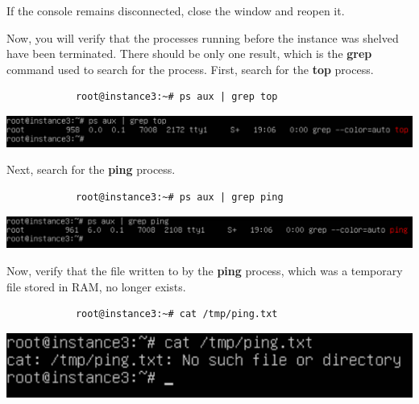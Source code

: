 \documentclass[letterpaper, 12pt]{article}
\begin{document}
\begin{enumerate}
    \begin{tipbox}
        If the console remains disconnected, close the window and reopen it.
    \end{tipbox}

    \begin{labstep}
        Now, you will verify that the processes running before the instance was shelved have been terminated.
        There should be only one result, which is the \textbf{grep} command used to search for the process.
        First, search for the \textbf{top} process.
        \begin{lstlisting}
            root@instance3:~# ps aux | grep top
        \end{lstlisting}

        \begin{center}
            \includegraphics[width=\linewidth]{images/part6/step14.png}
        \end{center}
    \end{labstep}

    \begin{labstep}
        Next, search for the \textbf{ping} process.
        \begin{lstlisting}
            root@instance3:~# ps aux | grep ping
        \end{lstlisting}

        \begin{center}
            \includegraphics[width=\linewidth]{images/part6/step15.png}
        \end{center}
    \end{labstep}

    \begin{labstep}
        Now, verify that the file written to by the \textbf{ping} process, which was a temporary file stored in RAM, no longer exists.
        \begin{lstlisting}
            root@instance3:~# cat /tmp/ping.txt
        \end{lstlisting}

        \begin{center}
            \includegraphics[width=\linewidth]{images/part6/step16.png}
        \end{center}
    \end{labstep}


\end{enumerate}
\end{document}
